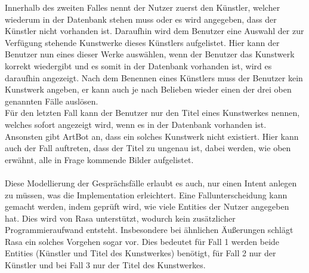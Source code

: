 Innerhalb des zweiten Falles nennt der Nutzer zuerst den Künstler, welcher wiederum in der Datenbank stehen muss oder es wird angegeben, dass der Künstler nicht vorhanden ist. Daraufhin wird dem Benutzer eine Auswahl der zur Verfügung stehende Kunstwerke dieses Künstlers aufgelistet. Hier kann der Benutzer nun eines dieser Werke auswählen, wenn der Benutzer das Kunstwerk korrekt wiedergibt und es somit in der Datenbank vorhanden ist, wird es daraufhin angezeigt. Nach dem Benennen eines Künstlers muss der Benutzer kein Kunstwerk angeben, er kann auch je nach Belieben wieder einen der drei oben genannten Fälle auslösen.\\
Für den letzten Fall kann der Benutzer nur den Titel eines Kunstwerkes nennen, welches sofort angezeigt wird, wenn es in der Datenbank vorhanden ist. Ansonsten gibt ArtBot an, dass ein solches Kunstwerk nicht existiert. Hier kann auch der Fall auftreten, dass der Titel zu ungenau ist, dabei werden, wie oben erwähnt, alle in Frage kommende Bilder aufgelistet.\\
\\
Diese Modellierung der Gesprächsfälle erlaubt es auch, nur einen Intent anlegen zu müssen, was die Implementation erleichtert. Eine Fallunterscheidung kann gemacht werden, indem geprüft wird, wie viele Entities der Nutzer angegeben hat. Dies wird von Rasa unterstützt, wodurch kein zusätzlicher Programmieraufwand entsteht. Insbesondere bei ähnlichen Äußerungen schlägt Rasa ein solches Vorgehen sogar vor. Dies bedeutet für Fall 1 werden beide Entities (Künstler und Titel des Kunstwerkes) benötigt, für Fall 2 nur der Künstler und bei Fall 3 nur der Titel des Kunstwerkes.
